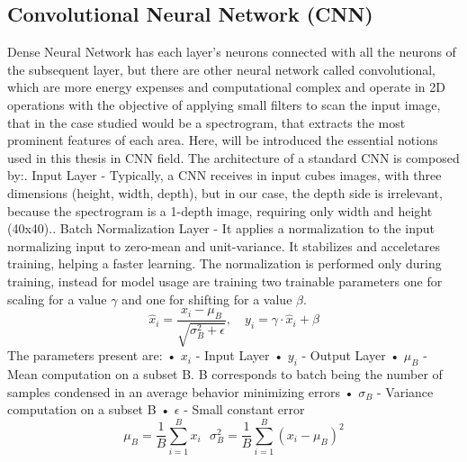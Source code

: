 \subsection{Convolutional Neural Network (CNN)}
Dense Neural Network has each layer's neurons connected with all the neurons of the subsequent layer, but there are other neural network called convolutional, which are more energy expenses and computational complex and operate in 2D operations with the objective of applying small filters to scan the input image, that in the case studied would be a spectrogram, that extracts the most prominent features of each area.\newline 
Here, will be introduced the essential notions used in this thesis in CNN field.\newline
The architecture of a standard CNN\cite{introduction_CNN} is composed by:\newline{}. Input Layer - Typically, a CNN receives in input cubes images, with three dimensions (height, width, depth), but in our case, the depth side is irrelevant, because the spectrogram is a 1-depth image, requiring only width and height (40x40).. Batch Normalization Layer - It applies a normalization to the input normalizing input to zero-mean and unit-variance. It stabilizes and acceletares training, helping a faster learning. The normalization is performed only during training, instead for model usage are training two trainable parameters one for scaling for a value $\gamma$ and one for shifting for a value $\beta$.\newline
\begin{equation}
    \hat{x}_i = \frac{x_i - \mu_B}{\sqrt{\sigma_B^2 + \epsilon}}, \quad
    y_i = \gamma \cdot \hat{x}_i + \beta
\end{equation}
The parameters present are:\newline
• $x_i$ - Input Layer\newline
• $y_i$ - Output Layer\newline
• $\mu_B$ - Mean computation on a subset B. B corresponds to batch being the number of samples condensed in an average behavior minimizing errors\newline
• $\sigma_B$ - Variance computation on a subset B\newline
• $\epsilon$ - Small constant error\newline
\begin{equation}
    \mu_B=\frac{1}{B}\sum_{i=1}^{B}x_i\,\,\,\,\sigma_B^2=\frac{1}{B}\sum_{i=1}^{B}(x_i-\mu_B)^2
\end{equation}
